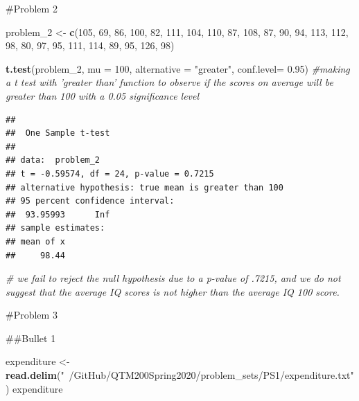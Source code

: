 \documentclass[]{article}
\newenvironment{Shaded}{\begin{snugshade}}{\end{snugshade}}
\newcommand{\CommentTok}[1]{\textcolor[rgb]{0.56,0.35,0.01}{\textit{#1}}}
\newcommand{\DataTypeTok}[1]{\textcolor[rgb]{0.13,0.29,0.53}{#1}}
\newcommand{\DecValTok}[1]{\textcolor[rgb]{0.00,0.00,0.81}{#1}}
\newcommand{\FloatTok}[1]{\textcolor[rgb]{0.00,0.00,0.81}{#1}}
\newcommand{\KeywordTok}[1]{\textcolor[rgb]{0.13,0.29,0.53}{\textbf{#1}}}
\newcommand{\NormalTok}[1]{#1}
\newcommand{\StringTok}[1]{\textcolor[rgb]{0.31,0.60,0.02}{#1}}
\begin{document}
\#Problem 2

\begin{Shaded}
\begin{Highlighting}[]
\NormalTok{problem_}\DecValTok{2}\NormalTok{ <-}\StringTok{ }\KeywordTok{c}\NormalTok{(}\DecValTok{105}\NormalTok{, }\DecValTok{69}\NormalTok{, }\DecValTok{86}\NormalTok{, }\DecValTok{100}\NormalTok{, }\DecValTok{82}\NormalTok{, }\DecValTok{111}\NormalTok{, }\DecValTok{104}\NormalTok{, }\DecValTok{110}\NormalTok{, }\DecValTok{87}\NormalTok{, }\DecValTok{108}\NormalTok{, }\DecValTok{87}\NormalTok{, }\DecValTok{90}\NormalTok{, }\DecValTok{94}\NormalTok{, }\DecValTok{113}\NormalTok{, }\DecValTok{112}\NormalTok{, }\DecValTok{98}\NormalTok{, }\DecValTok{80}\NormalTok{, }\DecValTok{97}\NormalTok{, }\DecValTok{95}\NormalTok{, }\DecValTok{111}\NormalTok{, }\DecValTok{114}\NormalTok{, }\DecValTok{89}\NormalTok{, }\DecValTok{95}\NormalTok{, }\DecValTok{126}\NormalTok{, }\DecValTok{98}\NormalTok{)}

\KeywordTok{t.test}\NormalTok{(problem_}\DecValTok{2}\NormalTok{, }\DataTypeTok{mu =} \DecValTok{100}\NormalTok{, }\DataTypeTok{alternative =} \StringTok{"greater"}\NormalTok{, }\DataTypeTok{conf.level=} \FloatTok{0.95}\NormalTok{) }\CommentTok{#making a t test with 'greater than' function to observe if the scores on average will be greater than 100 with a 0.05 significance level}
\end{Highlighting}
\end{Shaded}

\begin{verbatim}
## 
##  One Sample t-test
## 
## data:  problem_2
## t = -0.59574, df = 24, p-value = 0.7215
## alternative hypothesis: true mean is greater than 100
## 95 percent confidence interval:
##  93.95993      Inf
## sample estimates:
## mean of x 
##     98.44
\end{verbatim}

\begin{Shaded}
\begin{Highlighting}[]
\CommentTok{# we fail to reject the null hypothesis due to a p-value of .7215, and we do not suggest that the average IQ scores is not higher  than the average IQ 100 score.  }
\end{Highlighting}
\end{Shaded}

\#Problem 3

\#\#Bullet 1

\begin{Shaded}
\begin{Highlighting}[]
\NormalTok{expenditure <-}\StringTok{ }\KeywordTok{read.delim}\NormalTok{(}\StringTok{"~/GitHub/QTM200Spring2020/problem_sets/PS1/expenditure.txt"}\NormalTok{)}
\NormalTok{expenditure}
\end{Highlighting}
\end{Shaded}
\end{document}
